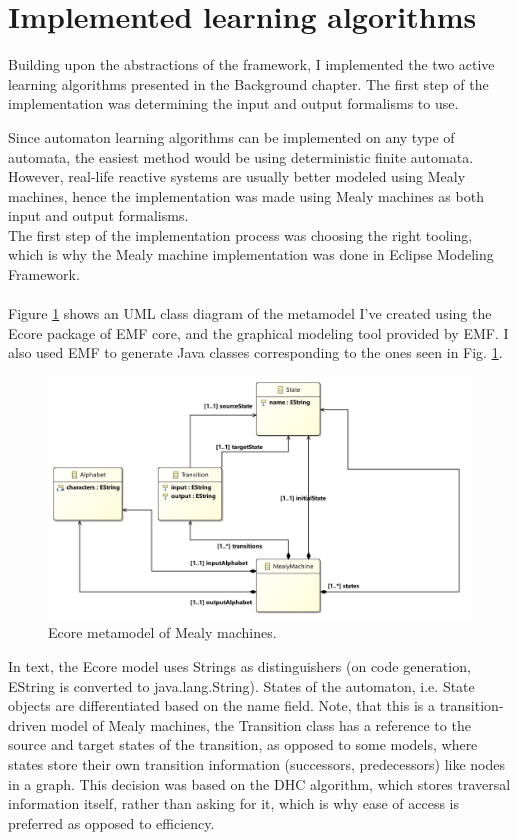 \section{Implemented learning algorithms}

Building upon the abstractions of the framework, I implemented the two active learning algorithms presented in the Background chapter. The first step of the implementation was determining the input and output formalisms to use.

Since automaton learning algorithms can be implemented on any type of automata, the easiest method would be using deterministic finite automata. However, real-life reactive systems are usually better modeled using Mealy machines, hence the implementation was made using Mealy machines as both input and output formalisms.
\\
The first step of the implementation process was choosing the right tooling, which is why the Mealy machine implementation was done in Eclipse Modeling Framework.
\\\\
Figure \ref*{fig:mealyecore} shows an UML class diagram of the metamodel I've created using the Ecore package of EMF core, and the graphical modeling tool provided by EMF. I also used EMF to generate Java classes corresponding to the ones seen in Fig. \ref*{fig:mealyecore}.

\begin{figure}
	\centering
	\includegraphics[width=1.0\linewidth]{figures/mealymodel}
	\caption{Ecore metamodel of Mealy machines.}
	\label{fig:mealyecore}
\end{figure}

In text, the Ecore model uses Strings as distinguishers (on code generation, EString is converted to java.lang.String). States of the automaton, i.e. State objects are differentiated based on the name field. Note, that this is a transition-driven model of Mealy machines, the Transition class has a reference to the source and target states of the transition, as opposed to some models, where states store their own transition information (successors, predecessors) like nodes in a graph. This decision was based on the DHC algorithm, which stores traversal information itself, rather than asking for it, which is why ease of access is preferred as opposed to efficiency.


